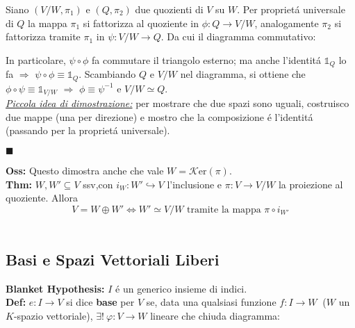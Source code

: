 \documentclass[a4paper,11pt]{article}
\newcommand{\dsum}{\oplus}
\newcommand{\Ker}{\mathcal{K}\mbox{er} }
\newcommand{\function}[3]{#1:#2 \rightarrow #3}
\newcommand{\injfunction}[3]{#1:#2 \hookrightarrow #3}
\newcommand{\thm}{\vskip 0.05cm \noindent \textbf{Thm:} }
\newcommand{\definition}{\vskip 0.05cm \noindent \textbf{Def:} }
\newcommand{\oss}{\vskip 0.05cm \noindent \textbf{Oss:} }
\newcommand{\vlad}{\underline{\it Piccola idea di dimostrazione:} }
\newcommand{\proofend}{\begin{flushright} $\blacksquare$ \end{flushright}}
\newcommand{\sse}{\Leftrightarrow}
\begin{document}
Siano $(V/W, \pi_{1})$ e $(Q, \pi_{2})$ due quozienti di $V$ su $W$. Per propriet\'a universale di $Q$ la mappa $\pi_{1}$ si fattorizza al quoziente in $\function{\phi}{Q}{V/W}$, analogamente $\pi_{2}$ si fattorizza tramite $\pi_{1}$ in $\function{\psi}{V/W}{Q}$. Da cui il diagramma commutativo:
\begin{center}
\end{center}
In particolare, $\psi\circ\phi$ fa commutare il triangolo esterno; ma anche l'identit\'a $\mathds{1}_{Q}$ lo fa $\Rightarrow$ $\psi\circ\phi \equiv \mathds{1}_{Q}$. Scambiando $Q$ e $V/W$ nel diagramma, si ottiene che $\phi\circ\psi \equiv \mathds{1}_{V/W}$ $\Rightarrow$ $\phi\equiv\psi^{-1}$ e $V/W \simeq Q$.\\
\vlad per mostrare che due spazi sono uguali, costruisco due mappe (una per direzione) e mostro che la composizione \'e l'identit\'a (passando per la propriet\'a universale).
\proofend
\oss Questo dimostra anche che vale $W=\Ker(\pi)$.
\\
\thm $W, W' \subseteq V$ ssv,con $\injfunction{i_{W}}{W'}{V}$ l'inclusione e $\function{\pi}{V}{V/W}$ la proiezione al quoziente. Allora 
$$ V=W\dsum W' \sse W' \simeq V/W \mbox{ tramite la mappa } \pi\circ i_{W'}$$
\\
\subsection{Basi e Spazi Vettoriali Liberi}
{\bf Blanket Hypothesis:} $I$ \'e un generico insieme di indici.\\
\definition $\function{e}{I}{V}$ si dice {\bf base} per $V$ se, data una qualsiasi funzione $\function{f}{I}{W}$ $\ $($W$ un $K$-spazio vettoriale), $\exists !\ \function{\varphi}{V}{W}$ lineare che chiuda diagramma:

\begin{center}
\end{center}
\end{document}
